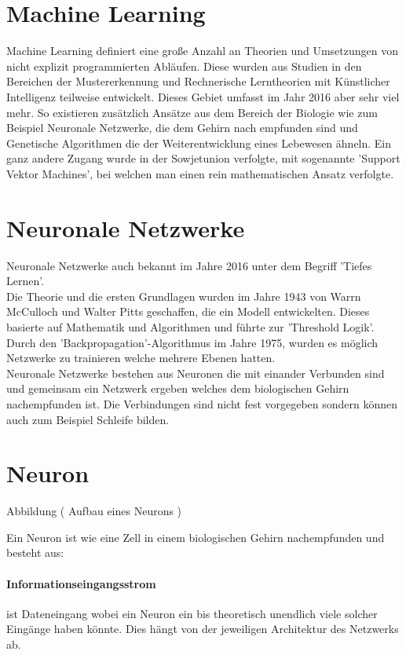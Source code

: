 \section{Machine Learning}

Machine Learning definiert eine große Anzahl an Theorien und Umsetzungen von nicht explizit programmierten Abläufen. Diese wurden aus Studien in den Bereichen der Mustererkennung und Rechnerische Lerntheorien mit Künstlicher Intelligenz teilweise entwickelt. Dieses Gebiet umfasst im Jahr 2016 aber sehr viel mehr. So existieren zusätzlich Ansätze aus dem Bereich der Biologie wie zum Beispiel Neuronale Netzwerke, die dem Gehirn nach empfunden sind und Genetische Algorithmen die der Weiterentwicklung eines Lebewesen ähneln. Ein ganz andere Zugang wurde in der Sowjetunion verfolgte, mit sogenannte 'Support Vektor Machines', bei welchen man einen rein mathematischen Ansatz verfolgte.

\section{Neuronale Netzwerke}

Neuronale Netzwerke auch bekannt im Jahre 2016 unter dem Begriff 'Tiefes Lernen'. \\

Die Theorie und die ersten Grundlagen wurden im Jahre 1943 von Warrn McCulloch und Walter Pitts geschaffen, die ein Modell entwickelten. Dieses basierte auf Mathematik und Algorithmen und führte zur 'Threshold Logik'. Durch den 'Backpropagation'-Algorithmus im Jahre 1975, wurden es möglich Netzwerke zu trainieren welche mehrere Ebenen hatten. \\

Neuronale Netzwerke bestehen aus Neuronen die mit einander Verbunden sind und gemeinsam ein Netzwerk ergeben welches dem biologischen Gehirn nachempfunden ist. Die Verbindungen sind nicht fest vorgegeben sondern können auch zum Beispiel Schleife bilden.

\section{Neuron}

Abbildung ( Aufbau eines Neurons )

Ein Neuron ist wie eine Zell in einem biologischen Gehirn nachempfunden und besteht aus:
\paragraph{Informationseingangsstrom} ist Dateneingang wobei ein Neuron ein bis theoretisch unendlich viele solcher Eingänge haben könnte. Dies hängt von der jeweiligen Architektur des Netzwerks ab.
